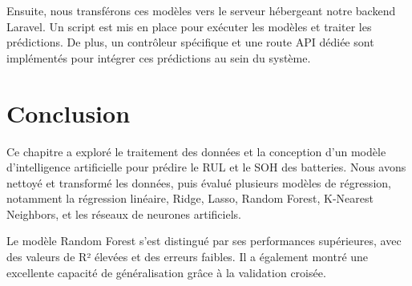 Ensuite, nous transférons ces modèles vers le serveur hébergeant notre backend Laravel. Un script est mis en place pour exécuter les modèles et traiter les prédictions. De plus, un contrôleur spécifique et une route API dédiée sont implémentés pour intégrer ces prédictions au sein du système.  


\section{Conclusion}
Ce chapitre a exploré le traitement des données et la conception d'un modèle d'intelligence artificielle pour prédire le RUL et le SOH des batteries. Nous avons nettoyé et transformé les données, puis évalué plusieurs modèles de régression, notamment la régression linéaire, Ridge, Lasso, Random Forest, K-Nearest Neighbors, et les réseaux de neurones artificiels.

Le modèle Random Forest s'est distingué par ses performances supérieures, avec des valeurs de R² élevées et des erreurs faibles. Il a également montré une excellente capacité de généralisation grâce à la validation croisée.




























